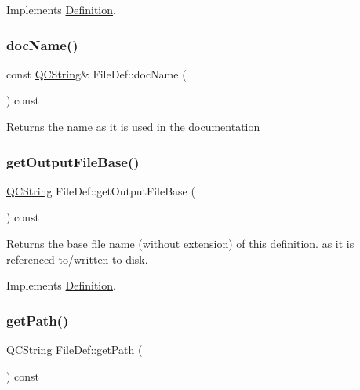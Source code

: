 Implements \mbox{\hyperlink{class_definition_ac4741f70f06baac174cf71b3e11d06ac}{Definition}}.

\mbox{\label{class_file_def_a0ce6ecbcf84b6731120dfcd56c4dc0d6}} 
\subsubsection{\texorpdfstring{docName()}{docName()}}
{\footnotesize\ttfamily const \mbox{\hyperlink{class_q_c_string}{Q\+C\+String}}\& File\+Def\+::doc\+Name (\begin{DoxyParamCaption}{ }\end{DoxyParamCaption}) const\hspace{0.3cm}{\ttfamily [inline]}}

Returns the name as it is used in the documentation \mbox{\label{class_file_def_a57496c4b5436110bd66fdfa1fee0eefe}} 
\subsubsection{\texorpdfstring{getOutputFileBase()}{getOutputFileBase()}}
{\footnotesize\ttfamily \mbox{\hyperlink{class_q_c_string}{Q\+C\+String}} File\+Def\+::get\+Output\+File\+Base (\begin{DoxyParamCaption}{ }\end{DoxyParamCaption}) const\hspace{0.3cm}{\ttfamily [virtual]}}

Returns the base file name (without extension) of this definition. as it is referenced to/written to disk. 

Implements \mbox{\hyperlink{class_definition_acabecdc6bfda2015811eed5f3436322d}{Definition}}.

\mbox{\label{class_file_def_a77330ac537f3a70224552c1373e03404}} 
\subsubsection{\texorpdfstring{getPath()}{getPath()}}
{\footnotesize\ttfamily \mbox{\hyperlink{class_q_c_string}{Q\+C\+String}} File\+Def\+::get\+Path (\begin{DoxyParamCaption}{ }\end{DoxyParamCaption}) const\hspace{0.3cm}{\ttfamily [inline]}}

